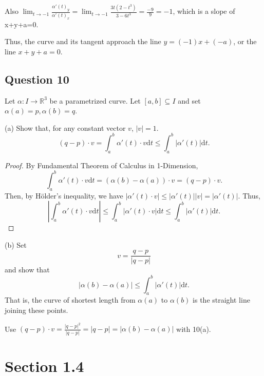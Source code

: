 \documentclass[12pt]{article}
\begin{document}
Also $\lim_{t\to -1}\frac {\alpha'(t)_y}{\alpha'(t)_x} = \lim_{t\to -1} \frac{3t(2-t^3)}{3-6t^3} = \frac{-9}{9}=-1$, which is a slope of x+y+a=0.

Thus, the curve and its tangent approach the line $y = (-1)x + (-a)$, or the line $x + y + a = 0.$

\subsection*{Question 10}

Let $\alpha: I \to \mathbb{R}^3$ be a parametrized curve.
Let $[a,b] \subseteq I$ and set $\alpha(a) = p, \alpha(b) = q.$

(a) Show that, for any constant vector $v$, $|v| = 1$.
     \begin{equation*}
          (q-p)\cdot v = \int_a^b \alpha'(t)\cdot v \mathrm{d}t \leq \int_a^b |\alpha'(t)| \mathrm dt.
     \end{equation*}

\begin{proof}
     By Fundamental Theorem of Calculus in 1-Dimension,
     $$\int_a^b \alpha'(t)\cdot v\mathrm dt = (\alpha(b) - \alpha(a))\cdot v = (q-p)\cdot v.$$
     Then, by H\"{o}lder's inequality, we have $|\alpha'(t)\cdot v| \leq |\alpha'(t)||v| = |\alpha'(t)|.$
     Thus, $$\left |\int_a^b \alpha'(t)\cdot v\mathrm dt\right | \leq \int_a^b |\alpha'(t)\cdot v| \mathrm dt \leq \int_a^b |\alpha'(t)| \mathrm dt.$$
\end{proof}

(b) Set $$v = \frac{q-p}{|q-p|}$$ and show that
$$|\alpha(b)-\alpha(a)| \leq \int_a^b |\alpha'(t)|\mathrm dt.$$
That is, the curve of shortest length from $\alpha(a)$ to $\alpha(b)$
is the straight line joining these points.

\begin{corollary}
     Use $(q-p)\cdot v = \frac{|q-p|^2}{|q-p|} = |q-p| = |\alpha(b) - \alpha(a)|$ with 10(a).
\end{corollary}
\section{Section 1.4}
\end{document}
